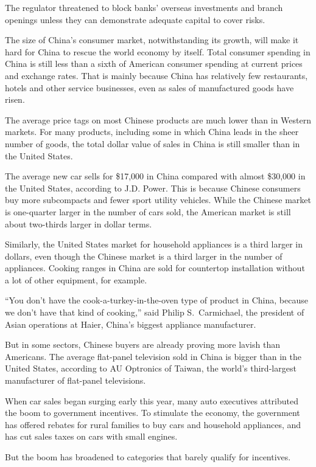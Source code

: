 ﻿\documentclass[12pt]{article}
\begin{document}
The regulator threatened to block banks' overseas investments and branch openings unless they can
demonstrate adequate capital to cover risks.

The size of China's consumer market, notwithstanding its growth, will make it hard for China to
rescue the world economy by itself. Total consumer spending in China is still less than a sixth of
American consumer spending at current prices and exchange rates. That is mainly because China has
relatively few restaurants, hotels and other service businesses, even as sales of manufactured goods
have risen.

The average price tags on most Chinese products are much lower than in Western markets. For many
products, including some in which China leads in the sheer number of goods, the total dollar value
of sales in China is still smaller than in the United States.

The average new car sells for \$17,000 in China compared with almost \$30,000 in the United States,
according to J.D. Power. This is because Chinese consumers buy more subcompacts and fewer sport
utility vehicles. While the Chinese market is one-quarter larger in the number of cars sold, the
American market is still about two-thirds larger in dollar terms.

Similarly, the United States market for household appliances is a third larger in dollars, even
though the Chinese market is a third larger in the number of appliances. Cooking ranges in China are
sold for countertop installation without a lot of other equipment, for example.

``You don't have the cook-a-turkey-in-the-oven type of product in China, because we don't have that
kind of cooking,'' said Philip S.~Carmichael, the president of Asian operations at Haier, China's
biggest appliance manufacturer.

But in some sectors, Chinese buyers are already proving more lavish than Americans. The average
flat-panel television sold in China is bigger than in the United States, according to AU Optronics
of Taiwan, the world's third-largest manufacturer of flat-panel televisions.

When car sales began surging early this year, many auto executives attributed the boom to government
incentives. To stimulate the economy, the government has offered rebates for rural families to buy
cars and household appliances, and has cut sales taxes on cars with small engines.

But the boom has broadened to categories that barely qualify for incentives.
\end{document}
